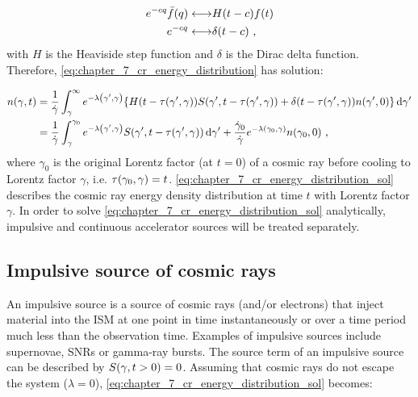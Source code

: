 \begin{equation}
    \begin{alignedat}{2}
    e^{-cq}\bar{f}\qty(q) &\longleftrightarrow && H\qty(t-c)f\qty(t) \\
    e^{-cq} &\longleftrightarrow && \delta\qty(t-c)\text{ ,}
\end{alignedat}
\end{equation}
\noindent with $H$ is the Heaviside step function and $\delta$ is the Dirac delta function. Therefore, \autoref{eq:chapter_7_cr_energy_distribution} has solution:

\begin{equation}
    \begin{aligned}
        n\qty(\gamma,t)&=\frac{1}{\dot{\gamma}}\int_\gamma^\infty e^{-\lambda\qty(\gamma',\gamma)} \qty{H\qty(t-\tau\qty(\gamma',\gamma))S\qty(\gamma',t-\tau\qty(\gamma',\gamma))+\delta\qty(t-\tau\qty(\gamma',\gamma))n\qty(\gamma',0)}\dd{\gamma'}  \\
        &=\frac{1}{\dot{\gamma}}\int_\gamma^{\gamma_0}  e^{-\lambda\qty(\gamma',\gamma)} S\qty(\gamma',t-\tau\qty(\gamma',\gamma))\dd{\gamma'}  + \frac{\dot{\gamma}_0}{\dot{\gamma}}e^{-\lambda\qty(\gamma_0,\gamma)} n\qty(\gamma_0,0)\text{ ,}
    \end{aligned}  \label{eq:chapter_7_cr_energy_distribution_sol}
\end{equation}
\noindent where $\gamma_0$ is the original Lorentz factor (at $t=0$) of a cosmic ray before cooling to Lorentz factor $\gamma$, i.e. $\tau\qty(\gamma_0,\gamma)=t$. \autoref{eq:chapter_7_cr_energy_distribution_sol} describes the cosmic ray energy density distribution at time $t$ with Lorentz factor $\gamma$. In order to solve \autoref{eq:chapter_7_cr_energy_distribution_sol} analytically, impulsive and continuous accelerator sources will be treated separately. 

\subsection{Impulsive source of cosmic rays}

An impulsive source is a source of cosmic rays (and/or electrons) that inject material into the ISM at one point in time instantaneously or over a time period much less than the observation time. Examples of impulsive sources include supernovae, SNRs or gamma-ray bursts. The source term of an impulsive source can be described by $S\qty(\gamma,t>0)=0$. Assuming that cosmic rays do not escape the system ($\lambda=0$), \autoref{eq:chapter_7_cr_energy_distribution_sol} becomes:

